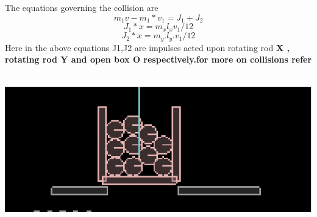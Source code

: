 \documentclass[11pt]{article}
\begin{document}
The equations governing the collision are\begin{equation}m_1v - m_1*v_1 = J_1 + J_2\end{equation}\begin{equation}J_1*x = m_xl_xv_1/12 \end{equation}\begin{equation}J_2*x = m_y.l_y.v_1/12 \end{equation}
Here in the above equations J1,J2 are impulses acted upon rotating rod \bf X \rm, rotating rod \bf Y \rm and open box \bf O \rm respectively.for more on collisions refer \cite{hcv}
\\
\\
\centerline{\includegraphics[scale=0.9]{11}}
\end{document}
